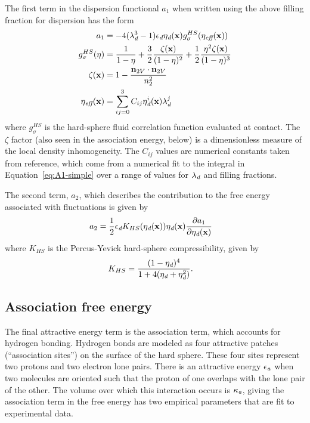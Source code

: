 \documentclass[letterpaper,twocolumn,amsmath,amssymb,prb]{revtex4-1}
\newcommand{\xx}{\textbf{x}}
\begin{document}
The first term in the dispersion functional $a_1$ when written using
the above filling fraction for dispersion has the form
\begin{align}
  a_1 &= 
   -4(\lambdadisp^3 - 1)\epsilondisp \etadisp(\xx)
    g^{HS}_\sigma(\eta_\textit{eff}(\xx)) \\
  g_\sigma^{HS}(\eta) &= \frac{1}{1-\eta}
  +\frac32\frac{\zeta(\xx)}{(1-\eta)^2}
  + \frac12\frac{\eta^2\zeta(\xx)}{(1-\eta)^3}
  \\
  \zeta(\xx) &= 1 - \frac{\mathbf{n}_{2V}\cdot\mathbf{n}_{2V}}{n_2^2}\\
  \eta_\textit{eff}(\xx) &= \sum_{ij=0}^3 C_{ij}  \etadisp^i(\xx)
  \lambdadisp^j
\end{align}
where $g_\sigma^{HS}$
is the hard-sphere fluid correlation function evaluated at contact.
The $\zeta$ factor
(also seen in the association energy, below) is a dimensionless
measure of the local density inhomogeneity. The $C_{ij}$ values
 are numerical constants taken from
reference\cite{gil-villegas-1997-SAFT-VR}, which come from a numerical
fit to the integral in Equation~\ref{eq:A1-simple} over a range of
values for $\lambda_\textit{d}$ and filling fractions.

The second term, $a_2$, which describes the contribution to the free
energy associated with fluctuations is given by
\begin{align}
  a_2 &= \frac12 \epsilondisp
              K_{HS}(\etadisp(\xx)) \etadisp(\xx)
              \frac{\partial a_1}{\partial \etadisp(\xx)}
\end{align}
where $K_{HS}$ is the Percus-Yevick hard-sphere compressibility, given
by
\begin{align}
  K_{HS} &=
    \frac{(1 - \eta_\textit{d})^4}{1 + 4(\eta_\textit{d} + \eta_\textit{d}^2)}.
\end{align}

\subsection{Association free energy}
The final attractive energy term is the association term, which
accounts for hydrogen bonding.  Hydrogen bonds are modeled as four
attractive patches (``association sites'') on the surface of the hard
sphere.  These four sites represent two protons and two electron lone
pairs.  There is an attractive energy $\epsilon_\textit{a}$ when
two molecules are oriented such that the proton of one overlaps
with the lone pair of the other.  The volume over which this
interaction occurs is $\kappa_\textit{a}$, giving the association
term in the free energy has two empirical parameters that are fit to
experimental data.
\end{document}
